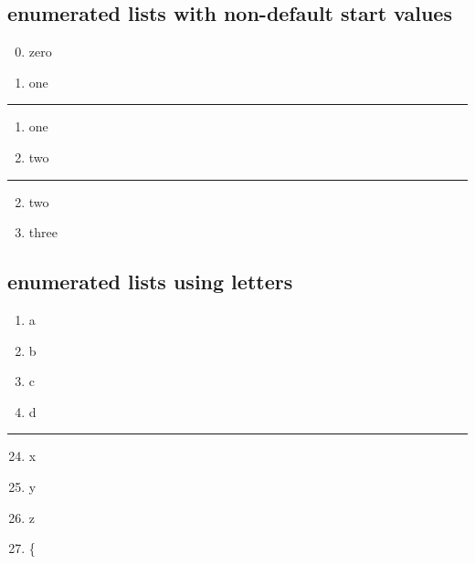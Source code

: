 \documentclass[letterpaper,10pt,english]{sphinxhowto}
\begin{document}
\subsection{enumerated lists with non-default start values}
\label{lists:enumerated-lists-with-non-default-start-values}\begin{enumerate}
\setcounter{enumi}{-1}
\item {} 
zero

\item {} 
one

\end{enumerate}


\bigskip\hrule{}\bigskip

\begin{enumerate}
\item {} 
one

\item {} 
two

\end{enumerate}


\bigskip\hrule{}\bigskip

\begin{enumerate}
\setcounter{enumi}{1}
\item {} 
two

\item {} 
three

\end{enumerate}


\subsection{enumerated lists using letters}
\label{lists:enumerated-lists-using-letters}\begin{enumerate}
\item {} 
a

\item {} 
b

\item {} 
c

\item {} 
d

\end{enumerate}


\bigskip\hrule{}\bigskip

\begin{enumerate}
\setcounter{enumi}{23}
\item {} 
x

\item {} 
y

\item {} 
z

\item {} 
\{

\end{enumerate}
\end{document}
